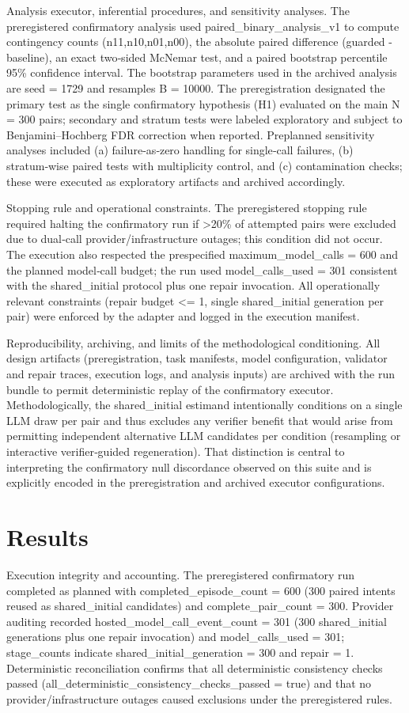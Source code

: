 \documentclass[conference]{IEEEtran}
\begin{document}
Analysis executor, inferential procedures, and sensitivity analyses. The preregistered confirmatory analysis used paired\_binary\_analysis\_v1 to compute contingency counts (n11,n10,n01,n00), the absolute paired difference (guarded - baseline), an exact two‑sided McNemar test, and a paired bootstrap percentile 95\% confidence interval. The bootstrap parameters used in the archived analysis are seed = 1729 and resamples B = 10000. The preregistration designated the primary test as the single confirmatory hypothesis (H1) evaluated on the main N = 300 pairs; secondary and stratum tests were labeled exploratory and subject to Benjamini--Hochberg FDR correction when reported. Preplanned sensitivity analyses included (a) failure‑as‑zero handling for single‑call failures, (b) stratum‑wise paired tests with multiplicity control, and (c) contamination checks; these were executed as exploratory artifacts and archived accordingly.

Stopping rule and operational constraints. The preregistered stopping rule required halting the confirmatory run if >20\% of attempted pairs were excluded due to dual‑call provider/infrastructure outages; this condition did not occur. The execution also respected the prespecified maximum\_model\_calls = 600 and the planned model‑call budget; the run used model\_calls\_used = 301 consistent with the shared\_initial protocol plus one repair invocation. All operationally relevant constraints (repair budget <= 1, single shared\_initial generation per pair) were enforced by the adapter and logged in the execution manifest.

Reproducibility, archiving, and limits of the methodological conditioning. All design artifacts (preregistration, task manifests, model configuration, validator and repair traces, execution logs, and analysis inputs) are archived with the run bundle to permit deterministic replay of the confirmatory executor. Methodologically, the shared\_initial estimand intentionally conditions on a single LLM draw per pair and thus excludes any verifier benefit that would arise from permitting independent alternative LLM candidates per condition (resampling or interactive verifier‑guided regeneration). That distinction is central to interpreting the confirmatory null discordance observed on this suite and is explicitly encoded in the preregistration and archived executor configurations.

\section{Results}
Execution integrity and accounting. The preregistered confirmatory run completed as planned with completed\_episode\_count = 600 (300 paired intents reused as shared\_initial candidates) and complete\_pair\_count = 300. Provider auditing recorded hosted\_model\_call\_event\_count = 301 (300 shared\_initial generations plus one repair invocation) and model\_calls\_used = 301; stage\_counts indicate shared\_initial\_generation = 300 and repair = 1. Deterministic reconciliation confirms that all deterministic consistency checks passed (all\_deterministic\_consistency\_checks\_passed = true) and that no provider/infrastructure outages caused exclusions under the preregistered rules.
\end{document}
